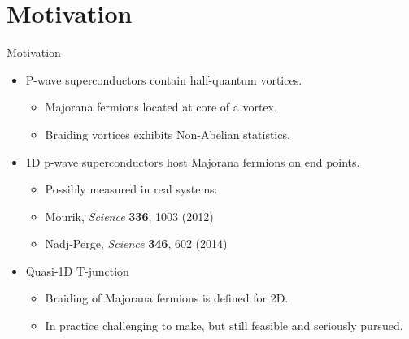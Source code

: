 \documentclass[xcolor=dvipsnames,10pt,aspectratio=169]{beamer}
\newcommand{\MO}{Motivation}
\begin{document}
  \section{\MO}
  \begin{frame}{\MO}{}

    \begin{multicols}{2}

    \begin{itemize}
      \item P-wave superconductors contain half-quantum vortices.
        \begin{itemize}
          \item Majorana fermions located at core of a vortex.
          \item Braiding vortices exhibits Non-Abelian statistics.
        \end{itemize}
      \item 1D p-wave superconductors host Majorana fermions on end points.
        \begin{itemize}
          \item Possibly measured in real systems:
          \item[] \hspace{0.40em}\scriptsize Mourik, \textit{Science} \textbf{336}, 1003 (2012)
          \item[] \hspace{0.50em}\scriptsize Nadj-Perge, \textit{Science} \textbf{346}, 602 (2014)
        \end{itemize}
      \item Quasi-1D T-junction
        \begin{itemize}
          \item Braiding of Majorana fermions is defined for 2D.
          \item In practice challenging to make, but still feasible and seriously pursued.
        \end{itemize}
    \end{itemize}

    \begin{figure}
      \end{figure}
    \end{multicols}


\end{frame}
\end{document}
